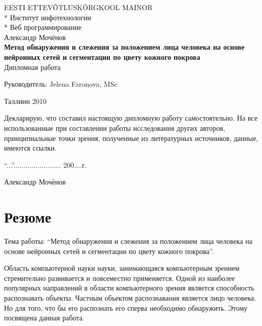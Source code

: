 \documentclass[12pt]{report}
\begin{document}

\begin{titlepage}
  \begin{center}
	\uppercase{Eesti Ettev\~{o}tlusk\~{o}rgkool Mainor}\\*
	Институт инфотехнологии\\*
	Веб программирование\\[8cm]
	Александр Мочёнов\\[1.5cm]
	\large
	\textbf{Метод обнаружения и слежения за положением лица человека на основе нейронных сетей и 
сегментации по цвету кожного покрова}\\[1cm]
	\normalsize
	Дипломная работа\\[2cm]
	\begin{flushright}
		Руководитель: Jelena Faronova, MSc\\[6cm]
	\end{flushright}
	Таллинн 2010
  \end{center}
  
Декларирую, что составил настоящую
дипломную работу самостоятельно.
На все использованные при составлении
работы исследования других авторов,
принципиальные точки зрения,
полученные из литературных источников,
данные, имеются ссылки.
\\[2cm]
\begin{flushright}
``...''........................ 200....г.

Александр Мочёнов
\end{flushright}

\end{titlepage}

\tableofcontents{\thispagestyle{fancyplain}}

\chapter*{Резюме}
\thispagestyle{fancy}

Тема работы: ``Метод обнаружения и слежения за положением лица человека на основе нейронных сетей и 
сегментации по цвету кожного покрова''.

Область компьютерной науки науки, занимающаяся компьютерным зрением стремительно развивается и повсеместно 
применяется. Одной из наиболее популярных направлений в области компьютерного зрения является способность 
распознавать объекты. Частным объектом распознавания является лицо человека. Но для того, что бы его распознать его 
сперва необходимо обнаружить. Этому посвящена данная работа.
\end{document}
